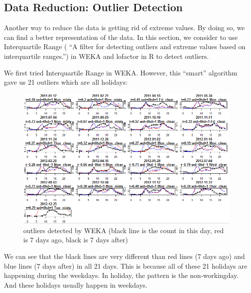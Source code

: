 \documentclass[12pt]{article}
\begin{document}
	\subsection{Data Reduction: Outlier Detection}
	Another way to reduce the data is getting rid of extreme values. By doing so, we can find a better representation of the data. In this section, we consider to use Interquartile Range ( ``A filter for detecting outliers and extreme values based on interquartile ranges.'') in WEKA  and lofactor in R to detect outliers.  
	
	We first tried Interquartile Range in WEKA. However, this ``smart'' algorithm gave us 21 outliers which are all holidays:
		\begin{figure}[H]
			\centering
			\includegraphics[scale=.65]{figures/outlier_weka_holliday.png}
			\caption{outliers detected by WEKA (black line is the count in this day, red is 7 days ago, black is 7 days after)}
		\end{figure}
	We can see that the black lines are very different than red lines (7 days ago) and blue lines (7 days after)	in all 21 days. This is because all of these 21 holidays are happening during the weekdays. In holiday, the pattern is the non-workingday. And these holidays usually happen in weekdays.
	
\end{document}
